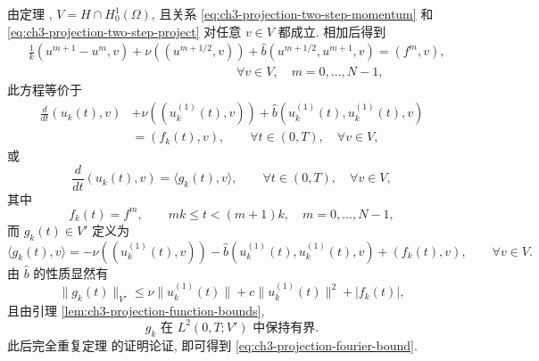\begin{Proof}
由定理 , $V=H\cap H_0^1(\Omega)$, 且关系 \eqref{eq:ch3-projection-two-step-momentum} 和 \eqref{eq:ch3-projection-two-step-project} 对任意 $v\in V$ 都成立. 相加后得到
\begin{equation}
\begin{aligned}
&\frac1k(u^{m+1}-u^m,v)+\nu((u^{m+1/2},v))
+\widehat b(u^{m+1/2},u^{m+1},v)=(f^m,v),\\
&\hspace{7cm}\forall v\in V,\quad m=0,\ldots,N-1,
\end{aligned}
\label{eq:ch3-projection-summed-discrete-equation}
\end{equation}
此方程等价于
\begin{equation}
\begin{aligned}
\frac{d}{dt}(u_k(t),v)
&+\nu((u_k^{(1)}(t),v))
+\widehat b(u_k^{(1)}(t),u_k^{(1)}(t),v)\\
&=(f_k(t),v),
\qquad\forall t\in(0,T),\quad\forall v\in V,
\end{aligned}
\label{eq:ch3-projection-time-equation}
\end{equation}
或
\begin{equation}
\frac{d}{dt}(u_k(t),v)=\langle g_k(t),v\rangle,
\qquad\forall t\in(0,T),\quad\forall v\in V,
\label{eq:ch3-projection-time-derivative}
\end{equation}
其中
\begin{equation}
f_k(t)=f^m,\qquad
mk\leq t<(m+1)k,\quad m=0,\ldots,N-1,
\label{eq:ch3-projection-piecewise-force}
\end{equation}
而 $g_k(t)\in V'$ 定义为
\begin{equation}
\langle g_k(t),v\rangle
=-\nu((u_k^{(1)}(t),v))
-\widehat b(u_k^{(1)}(t),u_k^{(1)}(t),v)
+(f_k(t),v),\qquad\forall v\in V.
\label{eq:ch3-projection-gk-definition}
\end{equation}
由 $\widehat b$ 的性质显然有
\begin{equation}
\lVert g_k(t)\rVert_{V'}
\leq\nu\lVert u_k^{(1)}(t)\rVert
+c\lVert u_k^{(1)}(t)\rVert^2+|f_k(t)|,
\label{eq:ch3-projection-gk-bound}
\end{equation}
且由引理 \ref{lem:ch3-projection-function-bounds},
\begin{equation}
g_k\text{ 在 }L^2(0,T;V')\text{ 中保持有界}.
\label{eq:ch3-projection-gk-l2-bound}
\end{equation}
此后完全重复定理  的证明论证, 即可得到 \eqref{eq:ch3-projection-fourier-bound}.
\end{Proof}


